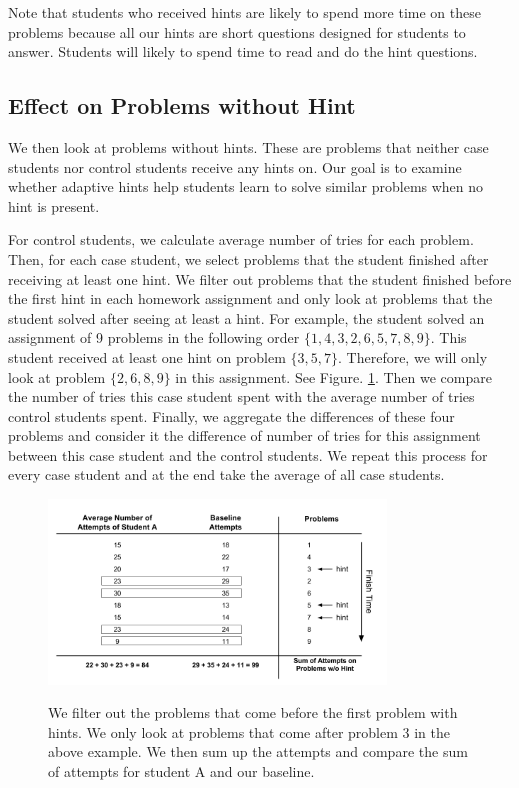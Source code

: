 \documentclass{llncs}
\begin{document}
Note that students who received hints are likely to spend more time on these problems because all our hints are short questions designed for students to answer. Students will likely to spend time to read and do the hint questions.

\subsection{Effect on Problems without Hint}
We then look at problems without hints. These are problems that neither case students nor control students receive any hints on. Our goal is to examine whether adaptive hints help students learn to solve similar problems when no hint is present.

For control students, we calculate average number of tries for each problem. Then, for each case student, we select problems that the student finished after receiving at least one hint. We filter out problems that the student finished before the first hint in each homework assignment and only look at problems that the student solved after seeing at least a hint. For example, the student solved an assignment of 9 problems in the following order $\{ 1, 4, 3, 2, 6, 5, 7, 8, 9\}$. This student received at least one hint on problem $\{3, 5, 7\}$. Therefore, we will only look at problem $\{2, 6, 8, 9\}$ in this assignment. See Figure. \ref{fig:pro_no_hint}. Then we compare the number of tries this case student spent with the average number of tries control students spent. Finally, we aggregate the differences of these four problems and consider it the difference of number of tries for this assignment between this case student and the control students. We repeat this process for every case student and at the end take the average of all case students.

\begin{figure}[ht]
   \centering
   \caption{We filter out the problems that come before the first problem with hints. We only look at problems that come after problem 3 in the above example. We then sum up the attempts and compare the sum of attempts for student A and our baseline.}
   \includegraphics[width=0.8\textwidth]{image/Filter_problems.png}
   \label{fig:pro_no_hint}
\end{figure}
\end{document}
